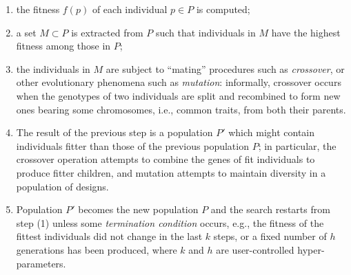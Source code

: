 \begin{enumerate}
	\item the fitness $f(p)$ of each individual $p \in P$ is computed; 
	\item a set $M \subset P$ is extracted from $P$ such that individuals
	in $M$ have the highest fitness among those in $P$;
	\item the individuals in $M$ are subject to ``mating'' procedures
	such as \emph{crossover}, or other evolutionary phenomena such as
	\emph{mutation}: informally, crossover occurs when the
        genotypes of two individuals are split and recombined to form
        new ones bearing some chromosomes, i.e., common traits, from
        both their parents. 
	\item The result of the previous step is a population $P'$ which might
	contain individuals fitter than those of the
	previous population $P$; in  particular, the crossover operation
	attempts to combine the genes of fit individuals to produce fitter
	children, and mutation attempts to maintain diversity
	in a population of designs. 
	\item Population $P'$ becomes the new population $P$ and the search
	restarts from step (1) unless some \emph{termination condition}
	occurs, e.g., the fitness of the fittest individuals did not
	change in the last $k$ steps, or a fixed number of $h$ generations has
	been produced, where $k$ and $h$ are user-controlled hyper-parameters. 
\end{enumerate}
